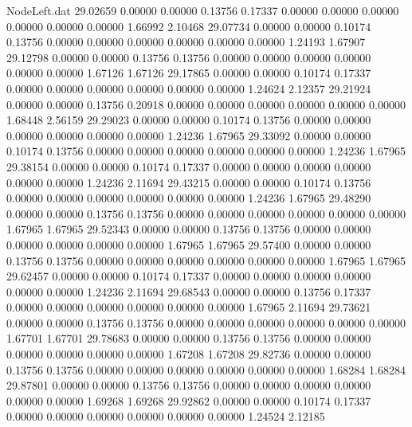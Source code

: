 \begin{filecontents}{NodeLeft.dat}
  29.02659    0.00000    0.00000     0.13756    0.17337    0.00000    0.00000    0.00000    0.00000    0.00000    0.00000    1.66992    2.10468
  29.07734    0.00000    0.00000     0.10174    0.13756    0.00000    0.00000    0.00000    0.00000    0.00000    0.00000    1.24193    1.67907
  29.12798    0.00000    0.00000     0.13756    0.13756    0.00000    0.00000    0.00000    0.00000    0.00000    0.00000    1.67126    1.67126
  29.17865    0.00000    0.00000     0.10174    0.17337    0.00000    0.00000    0.00000    0.00000    0.00000    0.00000    1.24624    2.12357
  29.21924    0.00000    0.00000     0.13756    0.20918    0.00000    0.00000    0.00000    0.00000    0.00000    0.00000    1.68448    2.56159
  29.29023    0.00000    0.00000     0.10174    0.13756    0.00000    0.00000    0.00000    0.00000    0.00000    0.00000    1.24236    1.67965
  29.33092    0.00000    0.00000     0.10174    0.13756    0.00000    0.00000    0.00000    0.00000    0.00000    0.00000    1.24236    1.67965
  29.38154    0.00000    0.00000     0.10174    0.17337    0.00000    0.00000    0.00000    0.00000    0.00000    0.00000    1.24236    2.11694
  29.43215    0.00000    0.00000     0.10174    0.13756    0.00000    0.00000    0.00000    0.00000    0.00000    0.00000    1.24236    1.67965
  29.48290    0.00000    0.00000     0.13756    0.13756    0.00000    0.00000    0.00000    0.00000    0.00000    0.00000    1.67965    1.67965
  29.52343    0.00000    0.00000     0.13756    0.13756    0.00000    0.00000    0.00000    0.00000    0.00000    0.00000    1.67965    1.67965
  29.57400    0.00000    0.00000     0.13756    0.13756    0.00000    0.00000    0.00000    0.00000    0.00000    0.00000    1.67965    1.67965
  29.62457    0.00000    0.00000     0.10174    0.17337    0.00000    0.00000    0.00000    0.00000    0.00000    0.00000    1.24236    2.11694
  29.68543    0.00000    0.00000     0.13756    0.17337    0.00000    0.00000    0.00000    0.00000    0.00000    0.00000    1.67965    2.11694
  29.73621    0.00000    0.00000     0.13756    0.13756    0.00000    0.00000    0.00000    0.00000    0.00000    0.00000    1.67701    1.67701
  29.78683    0.00000    0.00000     0.13756    0.13756    0.00000    0.00000    0.00000    0.00000    0.00000    0.00000    1.67208    1.67208
  29.82736    0.00000    0.00000     0.13756    0.13756    0.00000    0.00000    0.00000    0.00000    0.00000    0.00000    1.68284    1.68284
  29.87801    0.00000    0.00000     0.13756    0.13756    0.00000    0.00000    0.00000    0.00000    0.00000    0.00000    1.69268    1.69268
  29.92862    0.00000    0.00000     0.10174    0.17337    0.00000    0.00000    0.00000    0.00000    0.00000    0.00000    1.24524    2.12185

\end{filecontents}
